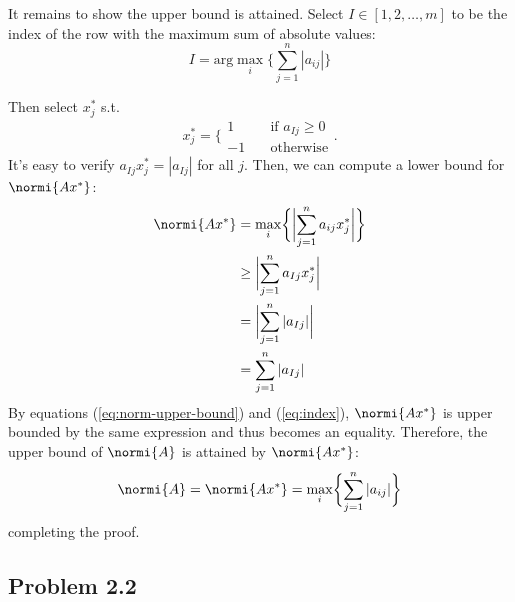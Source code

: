 \documentclass{homework}
\begin{document}
It remains to show the upper bound is attained. Select $I\in[1,2,\dots,m]$
to be the index of the row with the maximum sum of absolute values:
\begin{equation}
    I = \text{arg}\max_i \biggl\{\sum_{j=1}^n |a_{ij}|\biggr\}
    \label{eq:index}
\end{equation}

Then select $x_j^*$ s.t.
\begin{equation}
    x_j^* = \biggl\{
        \begin{array}{ll}
            1 &\quad \text{if } a_{Ij} \geq 0 \\
            -1 &\quad \text{otherwise}
        \end{array}
    \biggr.
\end{equation}
It's easy to verify $a_{Ij}x_j^* = |a_{Ij}|$ for all $j$. Then,
we can compute a lower bound for $\normi{Ax^*}$:
\begin{align*}
    \normi{Ax^*} &= \max_i \biggl\{
        \biggl\rvert \sum_{j=1}^n a_{ij}x_j^* \biggr\rvert
    \biggr\}\\
        &\geq \biggl\rvert \sum_{j=1}^n a_{Ij}x_j^* \biggr\rvert \\
        &= \biggl\rvert \sum_{j=1}^n |a_{Ij}| \biggr\rvert \\
        &= \sum_{j=1}^n |a_{Ij}|
\end{align*}
By equations (\ref{eq:norm-upper-bound}) and (\ref{eq:index}),
$\normi{Ax^*}$ is upper bounded by the same expression and thus becomes an equality.
Therefore, the upper bound of $\normi{A}$ is attained by $\normi{Ax^*}$:
\begin{equation}
    \normi{A} = \normi{Ax^*} = \max_i \biggl\{\sum_{j=1}^n |a_{ij}| \biggr\}
\end{equation}
completing the proof.

\subsection{Problem 2.2}

\newcommand{\bmax}[2]{\max_{#1} \biggl\{ #2 \biggr\}}
\end{document}
